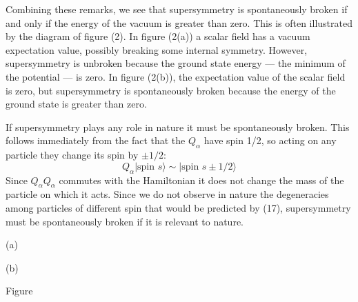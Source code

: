 \begingroup
\renewcommand{\thefootnote}{\fnsymbol{footnote}}
\endgroup

Combining these remarks, we see that supersymmetry is spontaneously
broken if and only if the energy of the vacuum is greater
than zero. This is often illustrated by the diagram of figure (2).
In figure (2(a)) a scalar field has a vacuum expectation value, possibly
breaking some internal symmetry. However, supersymmetry is
unbroken because the ground state energy --- the minimum of the potential
--- is zero. In figure (2(b)), the expectation value of the
scalar field is zero, but supersymmetry is spontaneously broken because the
energy of the ground state is greater than zero.

If supersymmetry plays any role in nature it must be spontaneously
broken. This follows immediately from the fact that the $Q_\alpha$
have spin 1/2, so acting on any particle they change its spin by $\pm 1/2$:
\begin{equation}
Q_\alpha |\text{spin } s\rangle \sim |\text{spin } s \pm 1/2\rangle
\tag{17}
\end{equation}
Since $Q_\alpha Q_\alpha$ commutes with the Hamiltonian it does not change the mass
of the particle on which it acts. Since we do not observe in nature
the degeneracies among particles of different spin that would be predicted
by (17), supersymmetry must be spontaneously broken if it is
relevant to nature.

\begin{center}
\begin{minipage}{0.34\textwidth}
\centering
{}
\par\smallskip
(a)
\end{minipage}\hfill
\begin{minipage}{0.34\textwidth}
\centering
{}
\par\smallskip
(b)
\end{minipage}
\par\smallskip
Figure~\thefigure
\end{center}

